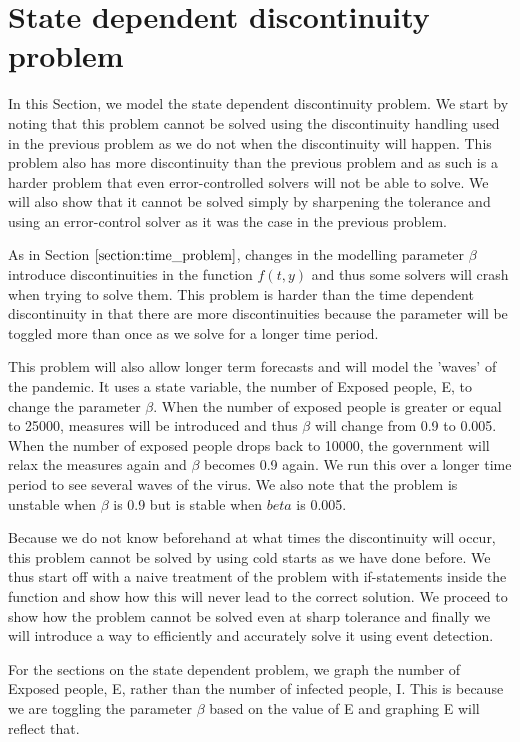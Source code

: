 
\section{State dependent discontinuity problem}
In this Section, we model the state dependent discontinuity problem. We start by noting that this problem cannot be solved using the discontinuity handling used in the previous problem as we do not when the discontinuity will happen. This problem also has more discontinuity than the previous problem and as such is a harder problem that even error-controlled solvers will not be able to solve. We will also show that it cannot be solved simply by sharpening the tolerance and using an error-control solver as it was the case in the previous problem.
 
As in Section $\ref{section:time_problem}$, changes in the modelling parameter $\beta$ introduce discontinuities in the function $f(t, y)$ and thus some solvers will crash when trying to solve them. This problem is harder than the time dependent discontinuity in that there are more discontinuities because the parameter will be toggled more than once as we solve for a longer time period.

This problem will also allow longer term forecasts and will model the 'waves' of the pandemic. It uses a state variable, the number of Exposed people, E, to change the parameter $\beta$. When the number of exposed people is greater or equal to 25000,  measures will be introduced and thus $\beta$ will change from 0.9 to 0.005. When the number of exposed people drops back to 10000, the government will relax the measures again and $\beta$ becomes 0.9 again. We run this over a longer time period to see several waves of the virus. We also note that the problem is unstable when $\beta$ is 0.9 but is stable when $beta$ is 0.005.

Because we do not know beforehand at what times the discontinuity will occur, this problem cannot be solved by using cold starts as we have done before. We thus start off with a naive treatment of the problem with if-statements inside the function and show how this will never lead to the correct solution. We proceed to show how the problem cannot be solved even at sharp tolerance and finally we will introduce a way to efficiently and accurately solve it using event detection.

For the sections on the state dependent problem, we graph the number of Exposed people, E, rather than the number of infected people, I. This is because we are toggling the parameter $\beta$ based on the value of E and graphing E will reflect that.

